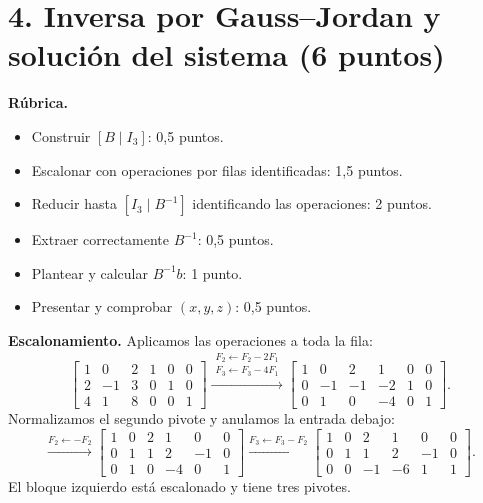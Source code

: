 \documentclass[10pt,a4]{examenEPN0}
\begin{document}
\section*{4. Inversa por Gauss--Jordan y solución del sistema (6 puntos)}
\noindent\textbf{Rúbrica.}
\begin{itemize}[itemsep=2pt]
    \item Construir $[B\mid I_3]$: 0,5 puntos.
    \item Escalonar con operaciones por filas identificadas: 1,5 puntos.
    \item Reducir hasta $[I_3\mid B^{-1}]$ identificando las operaciones: 2 puntos.
    \item Extraer correctamente $B^{-1}$: 0,5 puntos.
    \item Plantear y calcular $B^{-1}b$: 1 punto.
    \item Presentar y comprobar $(x,y,z)$: 0,5 puntos.
\end{itemize}
\noindent\textbf{Escalonamiento.} Aplicamos las operaciones a toda la fila:
\[
    \left[\begin{array}{ccc|ccc}
        1&0&2&1&0&0\\2&-1&3&0&1&0\\4&1&8&0&0&1
    \end{array}\right]
    \xrightarrow{\substack{F_2\leftarrow F_2-2F_1\\F_3\leftarrow F_3-4F_1}}
    \left[\begin{array}{ccc|ccc}
        1&0&2&1&0&0\\0&-1&-1&-2&1&0\\0&1&0&-4&0&1
    \end{array}\right].
\]
Normalizamos el segundo pivote y anulamos la entrada debajo:
\[
    \xrightarrow{F_2\leftarrow-F_2}
    \left[\begin{array}{ccc|ccc}
        1&0&2&1&0&0\\0&1&1&2&-1&0\\0&1&0&-4&0&1
    \end{array}\right]
    \xrightarrow{F_3\leftarrow F_3-F_2}
    \left[\begin{array}{ccc|ccc}
        1&0&2&1&0&0\\0&1&1&2&-1&0\\0&0&-1&-6&1&1
    \end{array}\right].
\]
El bloque izquierdo está escalonado y tiene tres pivotes.
\end{document}
